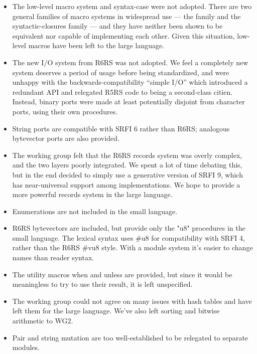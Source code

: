 \begin{itemize}

\item The low-level macro system and {\cf syntax-case} were not adopted. There
are two general families of macro systems in widespread use --- the
{ family and the syntactic-closures} family --- and they have
neither been shown to be equivalent nor capable of implementing each
other. Given this situation,
low-level macros have been left to the large language.

\item The new I/O system from R6RS was not adopted. We feel a completely new
system deserves a period of usage before being standardized, and were
unhappy with the backwards-compatibility ``simple I/O'' which introduced
a redundant API and relegated R5RS code to being a second-class
citien.  Instead, binary ports were made at least potentially disjoint from
character ports, using their own procedures.

\item String ports are compatible with SRFI 6 rather than R6RS; analogous
bytevector ports are also provided.

\item The working group felt that the R6RS records system was overly complex, and the two layers
poorly integrated. We spent a lot of time debating this, but in the
end decided to simply use a generative version of SRFI 9, which has
near-universal support among implementations. We hope to provide a more
powerful records system in the large language.

\item Enumerations are not included in the small language.

\item R6RS bytevectors are included, but provide only the "u8" procedures in the small
language.  The lexical syntax uses {\cf \#u8} for compatibility
with SRFI 4, rather than the R6RS {\cf \#vu8} style.
With a module system it's easier to change names than reader syntax.

\item The utility macros {\cf when} and {\cf unless} are provided, but since it would be
meaningless to try to use their result, it is left unspecified.

\item The working group could not agree on many issues with hash tables and have left them for
the large language. We've also left sorting and bitwise arithmetic to WG2.

\item Pair and string mutation are too well-established to be relegated to
separate modules.

\end{itemize}


